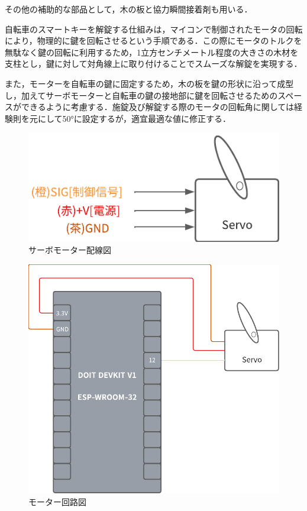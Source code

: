            \par その他の補助的な部品として，木の板と協力瞬間接着剤も用いる．
           \par 自転車のスマートキーを解錠する仕組みは，マイコンで制御されたモータの回転により，物理的に鍵を回転させるという手順である．この際にモータのトルクを無駄なく鍵の回転に利用するため，1立方センチメートル程度の大きさの木材を支柱とし，鍵に対して対角線上に取り付けることでスムーズな解錠を実現する．
           \par また，モーターを自転車の鍵に固定するため，木の板を鍵の形状に沿って成型し，加えてサーボモーターと自転車の鍵の接地部に鍵を回転させるためのスペースができるように考慮する．施錠及び解錠する際のモータの回転角に関しては経験則を元にして50°に設定するが，適宜最適な値に修正する．

          \begin{figure}[htbp]
            \centering
            \includegraphics[scale=1.96]
            {figures/ServoMotorWritingDiagram.png}
            \caption{サーボモーター配線図}
            \label{fig:サーボモーター配線図}
          \end{figure}

          \begin{figure}[htbp]
            \centering
            \includegraphics[scale=1.26]
            {figures/MotorCircuitDiagram.png}
            \caption{モーター回路図}
            \label{fig:モーター回路図}
          \end{figure}
      
